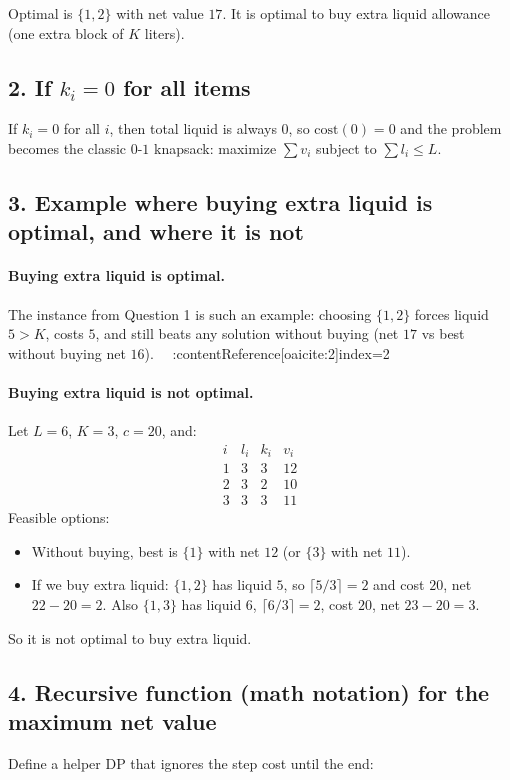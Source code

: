 \documentclass[a4paper,11pt]{article}
\begin{document}
	Optimal is $\{1,2\}$ with net value $17$. It is optimal to buy extra liquid allowance (one extra block of $K$ liters).

	\subsection{2. If $k_i=0$ for all items}
	If $k_i=0$ for all $i$, then total liquid is always $0$, so $\mathrm{cost}(0)=0$ and the problem becomes the classic $0$-$1$ knapsack:
	maximize $\sum v_i$ subject to $\sum l_i \le L$.

	\subsection{3. Example where buying extra liquid is optimal, and where it is not}
	\paragraph{Buying extra liquid is optimal.}
	The instance from Question 1 is such an example: choosing $\{1,2\}$ forces liquid $5>K$, costs $5$, and still beats any solution without buying (net $17$ vs best without buying net $16$). \ \ :contentReference[oaicite:2]{index=2}

	\paragraph{Buying extra liquid is not optimal.}
	Let $L=6$, $K=3$, $c=20$, and:
	\[
	\begin{array}{c|ccc}
		i & l_i & k_i & v_i\\ \hline
		1 & 3 & 3 & 12\\
		2 & 3 & 2 & 10\\
		3 & 3 & 3 & 11
	\end{array}
	\]
	Feasible options:
	\begin{itemize}[leftmargin=2em]
		\item Without buying, best is $\{1\}$ with net $12$ (or $\{3\}$ with net $11$).
		\item If we buy extra liquid: $\{1,2\}$ has liquid $5$, so $\lceil 5/3\rceil=2$ and cost $20$, net $22-20=2$.
		Also $\{1,3\}$ has liquid $6$, $\lceil 6/3\rceil=2$, cost $20$, net $23-20=3$.
	\end{itemize}
	So it is not optimal to buy extra liquid.

	\subsection{4. Recursive function (math notation) for the maximum net value}
	Define a helper DP that ignores the step cost until the end:
\end{document}
